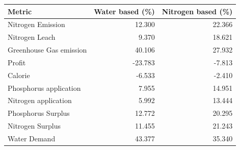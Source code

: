 \begin{tabular}{lrr}
\toprule
Metric & Water based (\%) & Nitrogen based (\%) \\
\midrule
Nitrogen Emission & 12.300 & 22.366 \\
Nitrogen Leach & 9.370 & 18.621 \\
Greenhouse Gas emission & 40.106 & 27.932 \\
Profit & -23.783 & -7.813 \\
Calorie & -6.533 & -2.410 \\
Phosphorus application & 7.955 & 14.951 \\
Nitrogen application & 5.992 & 13.444 \\
Phosphorus Surplus & 12.772 & 20.295 \\
Nitrogen Surplus & 11.455 & 21.243 \\
Water Demand & 43.377 & 35.340 \\
\bottomrule
\end{tabular}
